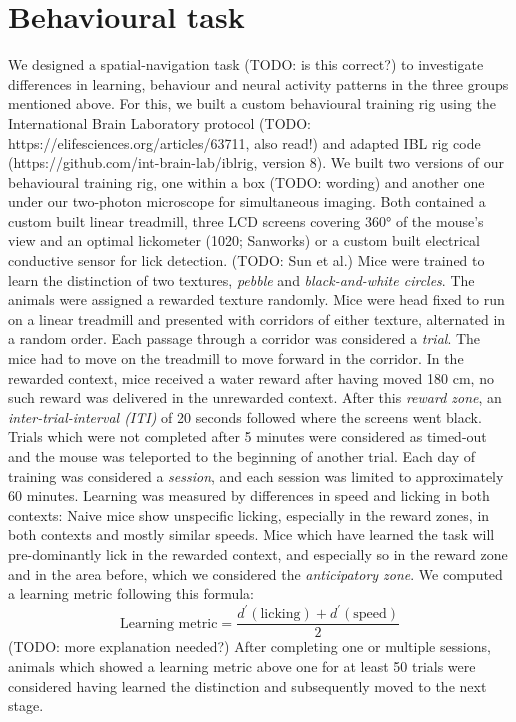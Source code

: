 \section{Behavioural task}
We designed a spatial-navigation task (TODO: is this correct?) to investigate differences in learning, behaviour and neural activity patterns in the three groups mentioned above.
For this, we built a custom behavioural training rig using the International Brain Laboratory protocol (TODO: https://elifesciences.org/articles/63711, also read!) and adapted IBL rig code (https://github.com/int-brain-lab/iblrig, version 8).
We built two versions of our behavioural training rig, one within a box (TODO: wording) and another one under our two-photon microscope for simultaneous imaging.
Both contained a custom built linear treadmill, three LCD screens covering 360° of the mouse's view and an optimal lickometer (1020; Sanworks) or a custom built electrical conductive sensor for lick detection.
(TODO: Sun et al.) Mice were trained to learn the distinction of two textures, \textit{pebble} and \textit{black-and-white circles}. The animals were assigned a rewarded texture randomly.  Mice were head fixed to run on a linear treadmill and presented with corridors of either texture, alternated in a random order. Each passage through a corridor was considered a \textit{trial}. The mice had to move on the treadmill to move forward in the corridor. In the rewarded context, mice received a water reward after having moved 180 cm, no such reward was delivered in the unrewarded context. After this \textit{reward zone}, an \textit{inter-trial-interval (ITI)} of 20 seconds followed where the screens went black. Trials which were not completed after 5 minutes were considered as timed-out and the mouse was teleported to the beginning of another trial. Each day of training was considered a \textit{session}, and each session was limited to approximately 60 minutes.
Learning was measured by differences in speed and licking in both contexts: Naive mice show unspecific licking, especially in the reward zones, in both contexts and mostly similar speeds. Mice which have learned the task will pre-dominantly lick in the rewarded context, and especially so in the reward zone and in the area before, which we considered the \textit{anticipatory zone}.
We computed a learning metric following this formula:
\begin{equation}
\text{Learning metric} = \frac{d^{\prime}(\text{licking}) + d^{\prime}(\text{speed})}{2}
\end{equation}
(TODO: more explanation needed?)
After completing one or multiple sessions, animals which showed a learning metric above one for at least 50 trials were considered having learned the distinction and subsequently moved to the next stage.
